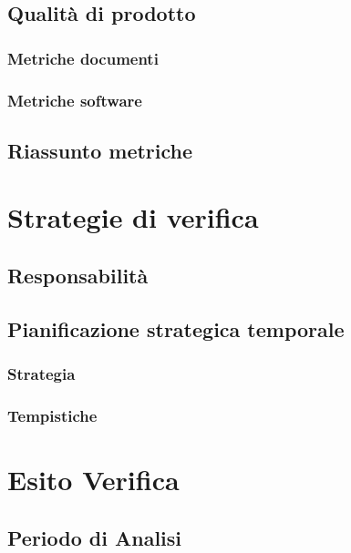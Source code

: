 \documentclass[a4paper, oneside, openany, dvipsnames, table]{article}
\begin{document}
	\subsection{Qualità di prodotto}
	
		\subsubsection{Metriche documenti}
		
		\subsubsection{Metriche software}
		
	\subsection{Riassunto metriche}
	
		
\section{Strategie di verifica}
	
	\subsection{Responsabilità}
		
	\subsection{Pianificazione strategica temporale}
		\subsubsection{Strategia}
			
		\subsubsection{Tempistiche}
			


\appendix
{}

\newpage
\section{Esito Verifica}
	\label{app:misure}
	\subsection{Periodo di Analisi}
	
\end{document}
